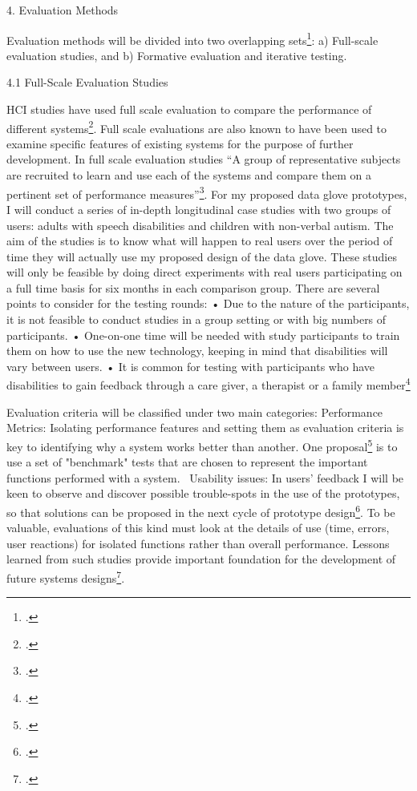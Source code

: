 4. Evaluation Methods 

Evaluation methods will be divided into two overlapping sets\footcite{Fallman2005}: 
a) Full-scale evaluation studies, and b) Formative evaluation and iterative testing.   

4.1 Full-Scale Evaluation Studies 

HCI studies have used full scale evaluation to compare the performance of different systems\footcite{Wania2006}.  Full scale evaluations are also known to have been used to examine specific features of existing systems for the purpose of further development.  In full scale evaluation studies “A group of representative subjects are recruited to learn and use each of the systems and compare them on a pertinent set of performance measures”\footcite{Cox2008}.
For my proposed data glove prototypes, I will conduct a series of in-depth longitudinal case studies with two groups of users: adults with speech disabilities and children with non-verbal autism. The aim of the studies is to know what will happen to real users over the period of time they will actually use my proposed design of the data glove. These studies will only be feasible by doing direct experiments with real users participating on a full time basis for six months in each comparison group. There are several points to consider for the testing rounds:
•	Due to the nature of the participants, it is not feasible to conduct studies in a group setting or with big numbers of participants. 
•	One-on-one time will be needed with study participants to train them on how to use the new technology, keeping in mind that disabilities will vary between users. 
•	It is common for testing with participants who have disabilities to gain feedback through a care giver, a therapist or a family member\footcite{Lazar2010}

Evaluation criteria will be classified under two main categories:
Performance Metrics: Isolating performance features and setting them as evaluation criteria is key to identifying why a system works better than another.  One proposal\footcite{Roberts1983} is to use a set of "benchmark" tests that are chosen to represent the important functions performed with a system. 
Usability issues: In users’ feedback I will be keen to observe and discover possible trouble-spots in the use of the prototypes, so that solutions can be proposed in the next cycle of prototype design\footcite{Klasnja2011}. To be valuable, evaluations of this kind must look at the details of use (time, errors, user reactions) for isolated functions rather than overall performance. Lessons learned from such studies provide important foundation for the development of future systems designs\footcite{Cox2008}.

